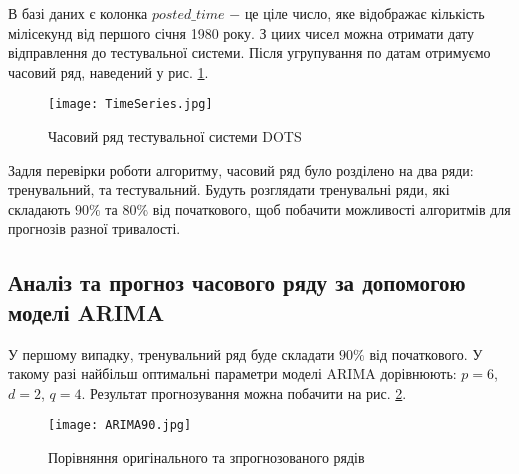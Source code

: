 В базі даних є колонка $posted\_time$ $-$ це ціле число, яке відображає кількість мілісекунд від першого січня 1980 року. З циих чисел можна отримати дату відправлення до тестувальної системи. Після угрупування по датам отримуємо часовий ряд, наведений у рис. \ref{fig:TimeSeries}.



\vspace{1em}

\begin{figure}[h]
  \texttt{[image: TimeSeries.jpg]}
  \caption{Часовий ряд тестувальної системи DOTS}
  \label{fig:TimeSeries}
\end{figure}

Задля перевірки роботи алгоритму, часовий ряд було розділено на два ряди: тренувальний, та тестувальний. Будуть розглядати тренувальні ряди, які складають $90\%$ та $80\%$ від початкового, щоб побачити можливості алгоритмів для прогнозів разної тривалості.

\subsection{Аналіз та прогноз часового ряду за допомогою моделі ARIMA}

У першому випадку, тренувальний ряд буде складати $90\%$ від початкового. У такому разі найбільш оптимальні параметри моделі ARIMA дорівнюють: $p = 6$, $d = 2$, $q = 4$. Результат прогнозування можна побачити на рис. \ref{fig:ARIMA90}.

\vspace{1em}

\begin{figure}[h]
  \texttt{[image: ARIMA90.jpg]}
  \caption{Порівняння оригінального та зпрогнозованого рядів}
  \label{fig:ARIMA90}
\end{figure}


